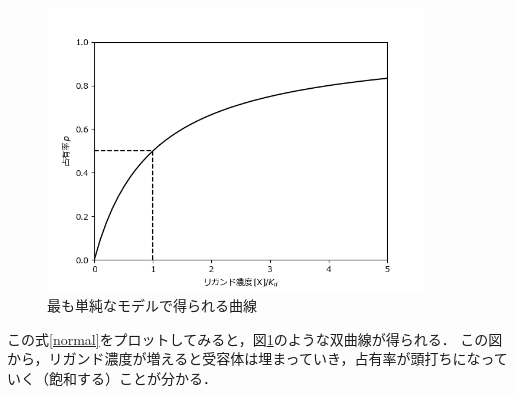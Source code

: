 \begin{figure}[htbp]
  \centering
  \includegraphics[width=10cm]{simple.png}
  \caption{最も単純なモデルで得られる曲線}
  \label{fig:simple}
\end{figure}

この式\eqref{normal}をプロットしてみると，図\ref{fig:simple}のような双曲線が得られる．
この図から，リガンド濃度が増えると受容体は埋まっていき，占有率が頭打ちになっていく（飽和する）ことが分かる．

